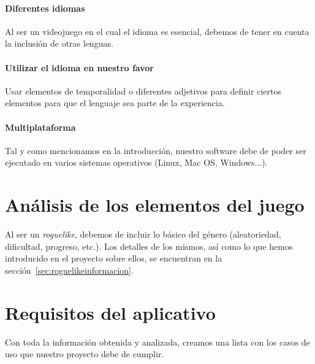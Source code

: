 	\paragraph{Diferentes idiomas} Al ser un videojuego en el cual el idioma es esencial, debemos de tener en cuenta la inclusión de otras lenguas.
  \paragraph{Utilizar el idioma en nuestro favor} Usar elementos de temporalidad o diferentes adjetivos para definir ciertos elementos para que el lenguaje sea parte de la experiencia.
	\paragraph{Multiplataforma} Tal y como mencionamos en la introducción, nuestro software debe de poder ser ejecutado en varios sistemas operativos (Linux, Mac OS, Windows...).


\section{Análisis de los elementos del juego}
Al ser un \textit{roguelike}, debemos de incluir lo básico del género (aleatoriedad, dificultad, progreso, etc.). Los detalles de los mismos, así como lo que hemos introducido en el proyecto sobre ellos, se encuentran en la sección~\ref{sec:roguelikeinformacion}.

\section{Requisitos del aplicativo}
Con toda la información obtenida y analizada, creamos una lista con los casos de uso que nuestro proyecto debe de cumplir.

